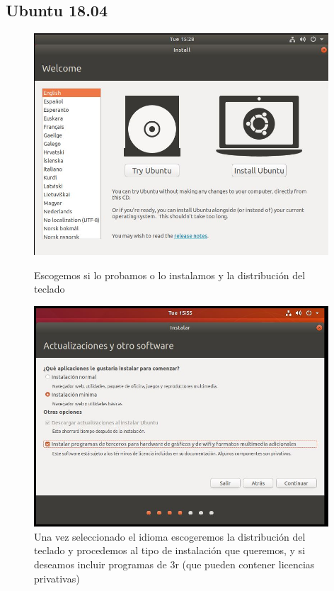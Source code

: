\documentclass[preprint,11pt]{elsarticle}
\begin{document}
\subsection{Ubuntu 18.04}
\begin{figure}[!htbp]
    \begin{center}
        \includegraphics[width=11cm]{anex/ubuntu1.JPG}
    \end{center}
    \caption{Escogemos si lo probamos o lo instalamos y la distribución del teclado}
    \begin{center}
        \includegraphics[width=11cm]{anex/ubuntu2.JPG}
    \end{center}
    \caption{Una vez seleccionado el idioma escogeremos la distribución del teclado y procedemos al tipo de instalación que queremos, y si deseamos incluir programas de 3r (que pueden contener licencias privativas)}
\end{figure}
\end{document}
